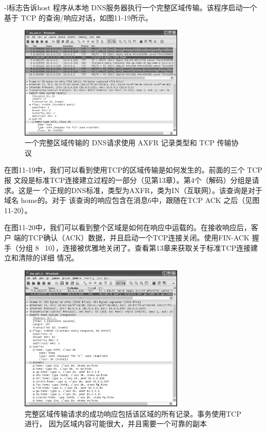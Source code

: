 -l标志告诉host 程序从本地 DNS服务器执行一个完整区域传输。该程序启动一个基于 TCP
的查询/响应对话，如图11-19所示。

\begin{figure}[!htb]
  \centering
  \includegraphics[width=0.7\textwidth]{imgs/11/11-19.png}
  \caption{一个完整区域传输的 DNS请求使用 AXFR 记录类型和 TCP 传输协议}
\end{figure}

在图11-19中，我们可以看到使用TCP的区域传输是如何发生的。前面的三个 TCP报
文段是标准TCP连接建立过程的一部分（见第13章）。第4个（解码）分组是请求。这是一
个正规的DNS标准，类型为AXFR，类为IN（互联网）。该查询是对于域名 home的。对于
该查询的响应包含在消息6中，跟随在TCP ACK 之后（见图11-20）。

在图11-20中，我们可以看到整个区域是如何在响应中运载的。在接收响应后，客户
端的TCP确认（ACK）数据，并且启动一个TCP连接关闭。使用FIN-ACK 握手（分组
8 ~10），连接被优雅地关闭了。查看第13章来获取关于标准TCP连接建立和清除的详细
情况。

\begin{figure}[!htb]
  \centering
  \includegraphics[width=0.7\textwidth]{imgs/11/11-20.png}
  \caption{完整区域传输请求的成功响应包括该区域的所有记录。事务使用TCP 进行，
  因为区域内容可能很大，并且需要一个可靠的副本}
\end{figure}

